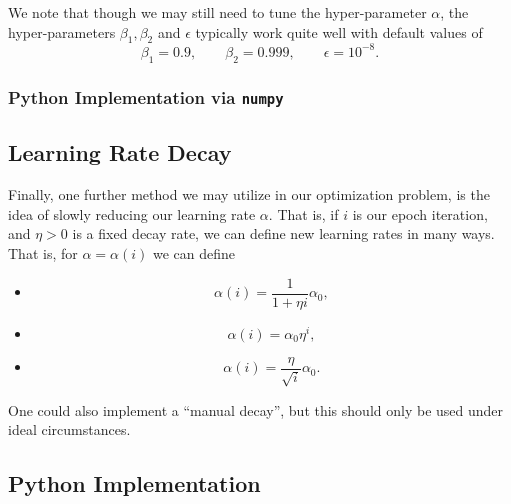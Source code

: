 We note that though we may still need to tune the hyper-parameter $\alpha$, the hyper-parameters $\beta_1,\beta_2$ and $\epsilon$ typically work quite well with default values of
$$\beta_1=0.9,\qquad\beta_2=0.999,\qquad\epsilon=10^{-8}.$$



\subsubsection{Python Implementation via \texttt{numpy}}






\subsection{Learning Rate Decay}

Finally, one further method we may utilize in our optimization problem, is the idea of slowly reducing our learning rate $\alpha$.  That is, if $i$ is our epoch iteration, and $\eta>0$ is a fixed decay rate, we can define new learning rates in many ways.  That is, for $\alpha=\alpha(i)$ we can define
\begin{itemize}
	\item $$\alpha(i)=\frac{1}{1+\eta i}\alpha_0,$$
	\item $$\alpha(i)=\alpha_0\eta^i,$$
	\item $$\alpha(i)=\frac{\eta}{\sqrt{i}}\alpha_0.$$
\end{itemize}
One could also implement a ``manual decay'', but this should only be used under ideal circumstances.



\subsection{Python Implementation}







